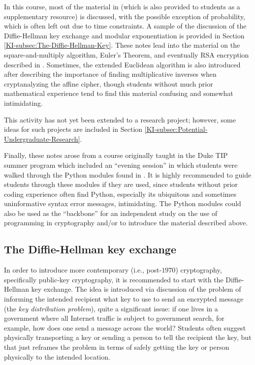 \documentclass[11pt]{article}
\theoremstyle{plain}
\theoremstyle{remark}
\theoremstyle{definition}
\theoremstyle{definition}
\theoremstyle{definition}
\theoremstyle{plain}
\theoremstyle{plain}
\theoremstyle{plain}
\theoremstyle{definition}
\begin{document}
In this course, most of the material in \cite{mcdevittClassNotesCryptologic2012}
(which is also provided to students as a supplementary resource) is discussed,
with the possible exception of probability, which is often left out
due to time constraints. A sample of the discussion of the
Diffie-Hellman key exchange and modular exponentiation is provided in Section
\ref{KI-subsec:The-Diffie-Hellman-Key}. These notes lead into the material
on the square-and-multiply algorithm, Euler's Theorem, and eventually
RSA encryption described in \cite{mcdevittClassNotesCryptologic2012}.
Sometimes, the extended Euclidean algorithm is also introduced after
describing the importance of finding multiplicative inverses when
cryptanalyzing the affine cipher, though students without much prior
mathematical experience tend to find this material confusing and somewhat
intimidating.

This activity has not yet been extended to a research
project; however, some ideas for such projects are included in Section
\ref{KI-subsec:Potential-Undergraduate-Research}.

Finally, these notes arose from a course originally taught in the
Duke TIP summer program which included an ``evening session'' in which
students were walked through the Python modules found in \cite{inceResourcesFirstYearCollege2022}.
It is highly recommended to guide students through these modules if they are used, since students without prior coding experience often
find Python, especially its ubiquitous and sometimes uninformative
syntax error messages, intimidating. The Python modules could also
be used as the ``backbone'' for an independent study on the use of
programming in cryptography and/or to introduce the material described
above.

\subsection{\label{KI-subsec:The-Diffie-Hellman-Key}The Diffie-Hellman key exchange}

In order to introduce more contemporary (i.e., post-$1970$) cryptography,
specifically public-key cryptography, it is recommended to start with the
Diffie-Hellman key exchange. The idea is introduced via discussion of the
problem of informing the intended recipient what key to use
to send an encrypted message (the \textit{key distribution problem}),
quite a significant issue: if one lives in a government where all
Internet traffic is subject to government search, for example, how
does one send a message across the world? Students often suggest physically
transporting a key or sending a person to tell the recipient the key,
but that just reframes the problem in terms of safely getting the
key or person physically to the intended location. 
\end{document}
